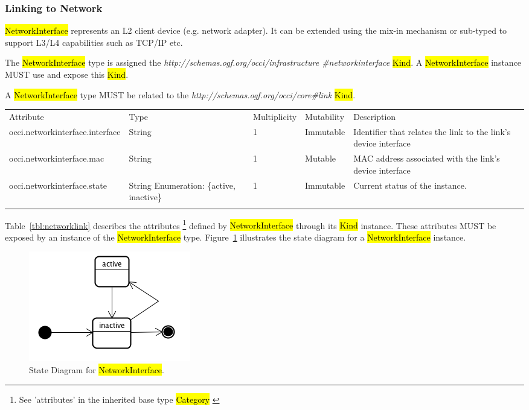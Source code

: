 \documentclass[10pt,a4paper]{article}
\begin{document}
\subsubsection{Linking to Network}
\hl{NetworkInterface} represents an L2 client device (e.g. network adapter). It can be extended using the mix-in mechanism or sub-typed to support L3/L4 capabilities such as TCP/IP etc. 

The \hl{NetworkInterface} type is assigned the \textit{http://schemas.ogf.org/occi/infrastructure
\#networkinterface} \hl{Kind}. A \hl{NetworkInterface} instance MUST use and expose this \hl{Kind}. 

A \hl{NetworkInterface} type MUST be related to the \textit{http://schemas.ogf.org/occi/core\#link} 
\hl{Kind}.

{
	\begin{tabular}{lp{2.5cm}p{1cm}lp{6cm}}
	\toprule
	Attribute&Type&Multi\-plicity&Mutability&Description\\
	\colrule
	occi.networkinterface.interface & String & 1 & Immutable 
	& Identifier that relates the link to the link's device interface\\
	occi.networkinterface.mac & String & 1 & Mutable 
	& MAC address associated with the link's device interface\\
	occi.networkinterface.state & String Enumeration: \{active, inactive\}& 1 
	& Immutable & Current status of the instance.\\
	\botrule
	\end{tabular}
}
Table~\ref{tbl:networklink} describes the attributes \footnote{See ’attributes’ in the inherited 
base type \hl{Category}  \cite{occi:core}} 
defined by \hl{NetworkInterface} through its \hl{Kind} instance. These attributes
MUST be exposed by an instance of the \hl{NetworkInterface} type. 
Figure~\ref{fig:networklink_state} illustrates the state diagram for a \hl{NetworkInterface} instance.

\begin{figure}[!h]
	\centering
	\includegraphics[scale=0.4]{figs/infra-link-state.png}
	\caption{State Diagram for \hl{NetworkInterface}.}
	\label{fig:networklink_state}
\end{figure}
\end{document}
